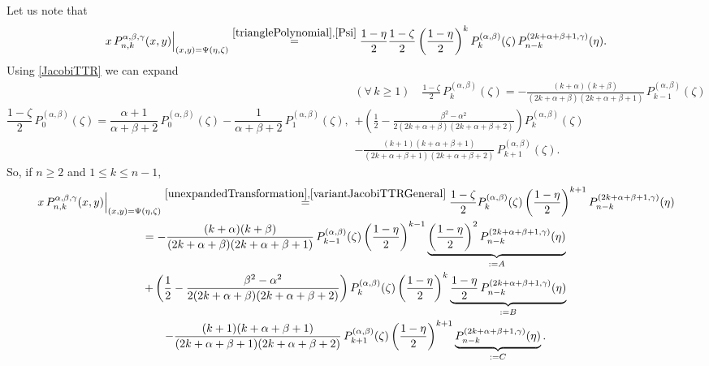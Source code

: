\documentclass{article}
\numberwithin{equation}{section}
\numberwithin{figure}{section}
\begin{document}
Let us note that
%
\begin{equation}\label{unexpandedTransformation}
\left. x \, P^{\alpha,\beta,\gamma}_{n,k}(x,y) \right|_{(x,y) = \Psi(\eta,\zeta)}
\stackrel{\eqref{trianglePolynomial},\eqref{Psi}}{=} \frac{1-\eta}{2} \frac{1-\zeta}{2} \left(\frac{1-\eta}{2}\right)^k P^{(\alpha,\beta)}_k(\zeta) \, P^{(2k+\alpha+\beta+1,\gamma)}_{n-k}(\eta).
\end{equation}
%
Using \eqref{JacobiTTR} we can expand
%
\begin{subequations}
\begin{equation}\label{variantJacobiTTRFirst}
\frac{1-\zeta}{2} \, P^{(\alpha,\beta)}_0(\zeta) = \frac{\alpha+1}{\alpha+\beta+2} \, P^{(\alpha,\beta)}_0(\zeta) - \frac{1}{\alpha+\beta+2} \, P^{(\alpha,\beta)}_1(\zeta),
\end{equation}
\begin{multline}\label{variantJacobiTTRGeneral}
(\forall\,k\geq 1) \quad \frac{1-\zeta}{2} \, P^{(\alpha,\beta)}_k(\zeta)
= -\frac{(k+\alpha)(k+\beta)}{(2k+\alpha+\beta)(2k+\alpha+\beta+1)} \, P^{(\alpha,\beta)}_{k-1}(\zeta)\\
+ \left( \frac{1}{2} - \frac{\beta^2-\alpha^2}{2(2k+\alpha+\beta)(2k+\alpha+\beta+2)} \right) P^{(\alpha,\beta)}_k(\zeta)\\
- \frac{(k+1)(k+\alpha+\beta+1)}{(2k+\alpha+\beta+1)(2k+\alpha+\beta+2)} \, P^{(\alpha,\beta)}_{k+1}(\zeta).
\end{multline}
\end{subequations}
%
So, if $n \geq 2$ and $1 \leq k \leq n-1$,
%
\begin{multline}\label{zetaExpanded}
\left. x \, P^{\alpha,\beta,\gamma}_{n,k}(x,y) \right|_{(x,y) = \Psi(\eta,\zeta)}
\stackrel{\eqref{unexpandedTransformation},\eqref{variantJacobiTTRGeneral}}{=} \frac{1-\zeta}{2} P^{(\alpha,\beta)}_k(\zeta) \left(\frac{1-\eta}{2}\right)^{k+1} P^{(2k+\alpha+\beta+1,\gamma)}_{n-k}(\eta)\\
= -\frac{(k+\alpha)(k+\beta)}{(2k+\alpha+\beta)(2k+\alpha+\beta+1)} \, P^{(\alpha,\beta)}_{k-1}(\zeta) \left(\frac{1-\eta}{2}\right)^{k-1} \underbrace{\left(\frac{1-\eta}{2}\right)^2 P^{(2k+\alpha+\beta+1,\gamma)}_{n-k}(\eta)}_{:= A}\\
+ \left( \frac{1}{2} - \frac{\beta^2-\alpha^2}{2(2k+\alpha+\beta)(2k+\alpha+\beta+2)} \right) P^{(\alpha,\beta)}_k(\zeta) \left(\frac{1-\eta}{2}\right)^k \underbrace{\frac{1-\eta}{2} \, P^{(2k+\alpha+\beta+1,\gamma)}_{n-k}(\eta)}_{:= B}\\
- \frac{(k+1)(k+\alpha+\beta+1)}{(2k+\alpha+\beta+1)(2k+\alpha+\beta+2)} \, P^{(\alpha,\beta)}_{k+1}(\zeta) \left(\frac{1-\eta}{2}\right)^{k+1} \underbrace{P^{(2k+\alpha+\beta+1,\gamma)}_{n-k}(\eta)}_{:= C}.
\end{multline}
%
\end{document}
